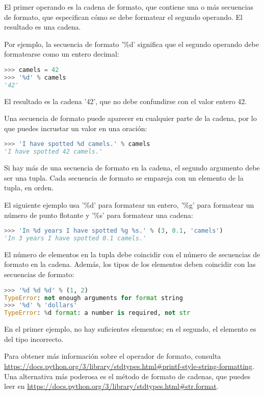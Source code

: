 El primer operando es la cadena de formato, que contiene una o más secuencias de formato, que especifican cómo se debe formatear el segundo operando. El resultado es una cadena.

Por ejemplo, la secuencia de formato '\%d' significa que el segundo operando debe formatearse como un entero decimal:

\begin{lstlisting}[language=Python]
>>> camels = 42
>>> '%d' % camels
'42'
\end{lstlisting}

El resultado es la cadena '42', que no debe confundirse con el valor entero 42.

Una secuencia de formato puede aparecer en cualquier parte de la cadena, por lo que puedes incrustar un valor en una oración:

\begin{lstlisting}[language=Python]
>>> 'I have spotted %d camels.' % camels
'I have spotted 42 camels.'
\end{lstlisting}

Si hay más de una secuencia de formato en la cadena, el segundo argumento debe ser una tupla. Cada secuencia de formato se empareja con un elemento de la tupla, en orden.

El siguiente ejemplo usa '\%d' para formatear un entero, '\%g' para formatear un número de punto flotante y '\%s' para formatear una cadena:

\begin{lstlisting}[language=Python]
>>> 'In %d years I have spotted %g %s.' % (3, 0.1, 'camels')
'In 3 years I have spotted 0.1 camels.'
\end{lstlisting}

El número de elementos en la tupla debe coincidir con el número de secuencias de formato en la cadena. Además, los tipos de los elementos deben coincidir con las secuencias de formato:

\begin{lstlisting}[language=Python]
>>> '%d %d %d' % (1, 2)
TypeError: not enough arguments for format string
>>> '%d' % 'dollars'
TypeError: %d format: a number is required, not str
\end{lstlisting}

En el primer ejemplo, no hay suficientes elementos; en el segundo, el elemento es del tipo incorrecto.

Para obtener más información sobre el operador de formato, consulta \url{https://docs.python.org/3/library/stdtypes.html#printf-style-string-formatting}. Una alternativa más poderosa es el método de formato de cadenas, que puedes leer en \url{https://docs.python.org/3/library/stdtypes.html#str.format}.

